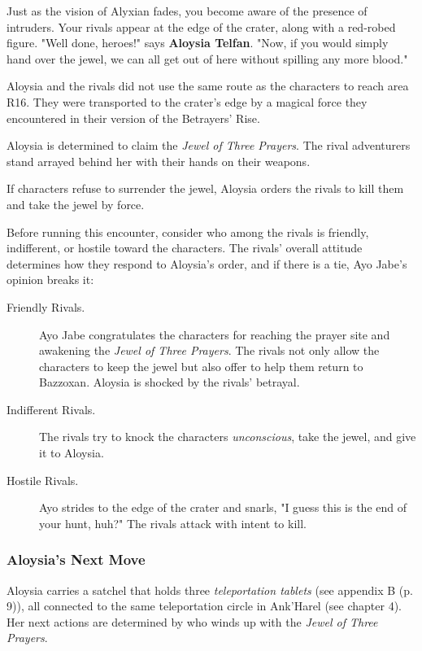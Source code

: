 \documentclass[a4paper, 11pt, bg=full, twocolumn, nooutline]{dndbook}
\begin{document}
\begin{DndReadAloud}
Just as the vision of Alyxian fades, you become aware of the presence of intruders. Your rivals appear at the edge of the crater, along with a red-robed figure. "Well done, heroes!" says \textbf{Aloysia Telfan}. "Now, if you would simply hand over the jewel, we can all get out of here without spilling any more blood."
\end{DndReadAloud}

Aloysia and the rivals did not use the same route as the characters to reach area R16. They were transported to the crater's edge by a magical force they encountered in their version of the Betrayers' Rise.

Aloysia is determined to claim the \textit{Jewel of Three Prayers}. The rival adventurers stand arrayed behind her with their hands on their weapons.

If characters refuse to surrender the jewel, Aloysia orders the rivals to kill them and take the jewel by force.

Before running this encounter, consider who among the rivals is friendly, indifferent, or hostile toward the characters. The rivals' overall attitude determines how they respond to Aloysia's order, and if there is a tie, Ayo Jabe's opinion breaks it:

\begin{description}
\item[Friendly Rivals.] Ayo Jabe congratulates the characters for reaching the prayer site and awakening the \textit{Jewel of Three Prayers}. The rivals not only allow the characters to keep the jewel but also offer to help them return to Bazzoxan. Aloysia is shocked by the rivals' betrayal.
\item[Indifferent Rivals.] The rivals try to knock the characters \textit{unconscious}, take the jewel, and give it to Aloysia.
\item[Hostile Rivals.] Ayo strides to the edge of the crater and snarls, "I guess this is the end of your hunt, huh?" The rivals attack with intent to kill.
\end{description}

\subsubsection{Aloysia's Next Move}

Aloysia carries a satchel that holds three \textit{teleportation tablets} (see appendix B (p. 9)), all connected to the same teleportation circle in Ank'Harel (see chapter 4). Her next actions are determined by who winds up with the \textit{Jewel of Three Prayers}.
\end{document}
